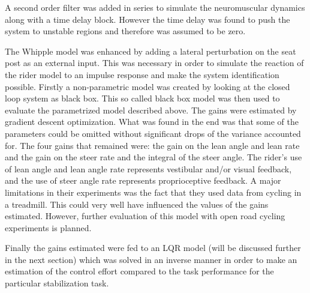 \par A second order filter was added in series to simulate the neuromuscular dynamics along with a time delay block. However the time delay was found to push the system to unstable regions and therefore was assumed to be zero.
\par
The Whipple model was enhanced by adding a lateral perturbation on the seat post as an external input. This was necessary in order to simulate the reaction of the rider model to an impulse response and make  the system identification possible. Firstly a non-parametric model was created by looking at the closed loop system as black box. This so called black box model was then used to evaluate the parametrized model described above. The gains were estimated by gradient descent optimization. What was found in the end was that some of the parameters could be omitted without significant drops of the variance accounted for. The four gains that remained were: the  gain on the lean angle and lean rate and the gain on the steer rate and the integral of the steer angle. The rider’s use of lean angle and lean angle rate represents vestibular and/or visual feedback, and the use of steer angle rate represents proprioceptive feedback. A major limitations in their experiments was the fact that they used data from cycling in a treadmill. This could very well have influenced the values of the gains estimated. However, further evaluation of this model with open road cycling experiments is planned.
\par
Finally the gains estimated were fed to an LQR model (will be discussed further in the next section) which was solved in an inverse manner in order to make an estimation of the control effort compared to the task performance for the particular stabilization task.

